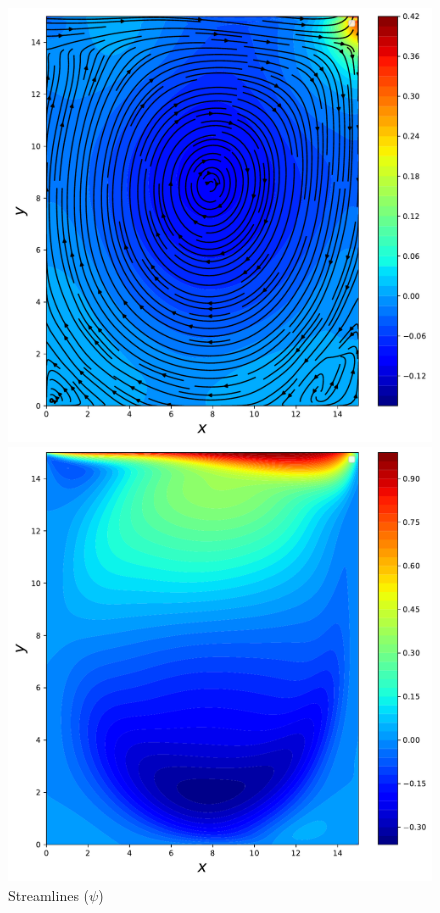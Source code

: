 \documentclass{article}
\begin{document}
    \begin{figure}[htb!]
	\includegraphics[width=\linewidth]{./images/Re1500FlowPy_pres_stream}
	\caption{Streamlines ($\psi$)}
	\label{fig:pres_example2}
	\endminipage\hfill
	\includegraphics[width=\linewidth]{./images/Re1500FlowPy_u}

\end{figure}
\end{document}
